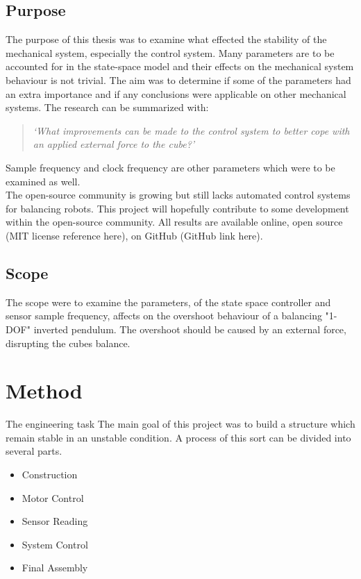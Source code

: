 \documentclass[a4paper,11pt]{kth-mag}
\newenvironment{italicquotes}
{\begin{quote}\itshape}
{\end{quote}}
\begin{document}
\section{Purpose}
The purpose of this thesis was to examine what effected the stability of the mechanical system, especially the control system. Many parameters are to be accounted for in the state-space model and their effects on the mechanical system behaviour is not trivial. 
The aim was to determine if some of the parameters had an extra importance and if any conclusions were applicable on other mechanical systems. The research can be summarized with: 
\begin{italicquotes}
`What improvements can be made to the control system to better cope with an applied external force to the cube?' \\
\end{italicquotes}
Sample frequency and clock frequency are other parameters which were to be examined as well.\\ The  open-source community is growing but still lacks automated control systems for balancing robots. This project will hopefully contribute to some development within the open-source community.
All results are available online, open source (MIT license reference here), on GitHub (GitHub link here).\\ 

\section{Scope}
The scope were to examine the parameters, of the state space controller and sensor sample frequency, affects on the overshoot behaviour of a balancing "1-DOF" inverted pendulum.
The overshoot should be caused by an external force, disrupting the cubes balance.

\chapter{Method}

The engineering task The main goal of this project was to build a structure which remain stable in an unstable condition. A process of this sort can be divided into several parts. 
\begin{itemize}
\item Construction
\item Motor Control
\item Sensor Reading
\item System Control
\item Final Assembly
\end{itemize}
\end{document}
